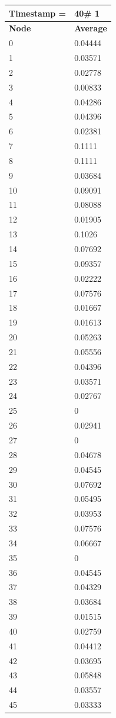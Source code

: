 \begin{tabular}{|l||l|}
\hline
\textbf{Timestamp =} & \textbf{40}\# 1\\\hline
	\textbf{Node} & \textbf{Average} \\ \hline
\hline
	0 & 0.04444 \\ \hline
	1 & 0.03571 \\ \hline
	2 & 0.02778 \\ \hline
	3 & 0.00833 \\ \hline
	4 & 0.04286 \\ \hline
	5 & 0.04396 \\ \hline
	6 & 0.02381 \\ \hline
	7 & 0.1111 \\ \hline
	8 & 0.1111 \\ \hline
	9 & 0.03684 \\ \hline
	10 & 0.09091 \\ \hline
	11 & 0.08088 \\ \hline
	12 & 0.01905 \\ \hline
	13 & 0.1026 \\ \hline
	14 & 0.07692 \\ \hline
	15 & 0.09357 \\ \hline
	16 & 0.02222 \\ \hline
	17 & 0.07576 \\ \hline
	18 & 0.01667 \\ \hline
	19 & 0.01613 \\ \hline
	20 & 0.05263 \\ \hline
	21 & 0.05556 \\ \hline
	22 & 0.04396 \\ \hline
	23 & 0.03571 \\ \hline
	24 & 0.02767 \\ \hline
	25 & 0 \\ \hline
	26 & 0.02941 \\ \hline
	27 & 0 \\ \hline
	28 & 0.04678 \\ \hline
	29 & 0.04545 \\ \hline
	30 & 0.07692 \\ \hline
	31 & 0.05495 \\ \hline
	32 & 0.03953 \\ \hline
	33 & 0.07576 \\ \hline
	34 & 0.06667 \\ \hline
	35 & 0 \\ \hline
	36 & 0.04545 \\ \hline
	37 & 0.04329 \\ \hline
	38 & 0.03684 \\ \hline
	39 & 0.01515 \\ \hline
	40 & 0.02759 \\ \hline
	41 & 0.04412 \\ \hline
	42 & 0.03695 \\ \hline
	43 & 0.05848 \\ \hline
	44 & 0.03557 \\ \hline
	45 & 0.03333 \\ \hline
\end{tabular}
